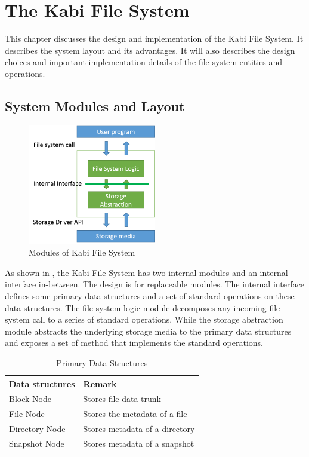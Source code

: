 \chapter{The Kabi File System}
\label{chap:fs}

    This chapter discusses the design and implementation of the Kabi File System. It describes the system layout and its advantages. It will also describes the design choices and important implementation details of the file system entities and operations.

\section{System Modules and Layout}

\begin{figure}[t]
\centering
\includegraphics[width=0.5\textwidth]{Chapter-3/figs/fig8.png}
\caption{Modules of Kabi File System}
\label{fig:modules}
\end{figure}

    As shown in , the Kabi File System has two internal modules and an internal interface in-between. The design is for replaceable modules. The internal interface defines some primary data structures and a set of standard operations on these data structures. The file system logic module decomposes any incoming file system call to a series of standard operations. While the storage abstraction module abstracts the underlying storage media to the primary data structures and exposes a set of method that implements the standard operations.

\begin{table}[t]
\label{tab:data_struct}
\begin{center}
\begin{tabular}{ll}
\toprule
Data structures & Remark\\
\midrule
Block Node & Stores file data trunk\\
File Node & Stores the metadata of a file\\
Directory Node & Stores metadata of a directory \\
Snapshot Node & Stores metadata of a snapshot\\
\bottomrule
\end{tabular}
\end{center}
\caption{Primary Data Structures}
\end{table}


